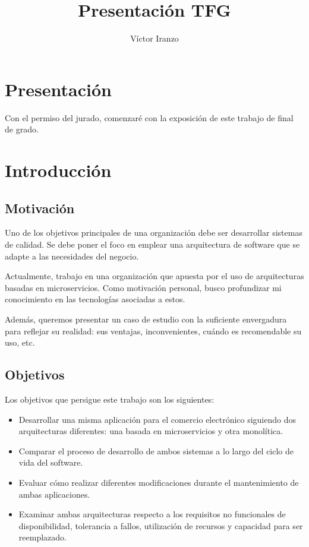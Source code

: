 \documentclass[11pt,a4paper]{article}
\author{Víctor Iranzo}
\title{Presentación TFG}
\begin{document}
\maketitle

\section{Presentación}

Con el permiso del jurado, comenzaré con la exposición de este trabajo de final de grado.

\section{Introducción}


\subsection{Motivación}

Uno de los objetivos principales de una organización debe ser desarrollar sistemas de calidad. Se debe poner el foco en emplear una arquitectura de software que se adapte a las necesidades del negocio.

Actualmente, trabajo en una organización que apuesta por el uso de arquitecturas basadas en microservicios. Como motivación personal, busco profundizar mi conocimiento en las tecnologías asociadas a estos.

Además, queremos presentar un caso de estudio con la suficiente envergadura para reflejar su realidad: sus ventajas, inconvenientes, cuándo es recomendable su uso, etc.

\subsection{Objetivos}

Los objetivos que persigue este trabajo son los siguientes:

\begin{itemize}

\item Desarrollar una misma aplicación para el comercio electrónico siguiendo dos arquitecturas diferentes: una basada en microservicios y otra monolítica.

\item Comparar el proceso de desarrollo de ambos sistemas a lo largo del ciclo de vida del software.

\item Evaluar cómo realizar diferentes modificaciones durante el mantenimiento de ambas aplicaciones.

\item Examinar ambas arquitecturas respecto a los requisitos no funcionales de disponibilidad, tolerancia a fallos, utilización de recursos y capacidad para ser reemplazado.

\end{itemize}
\end{document}
